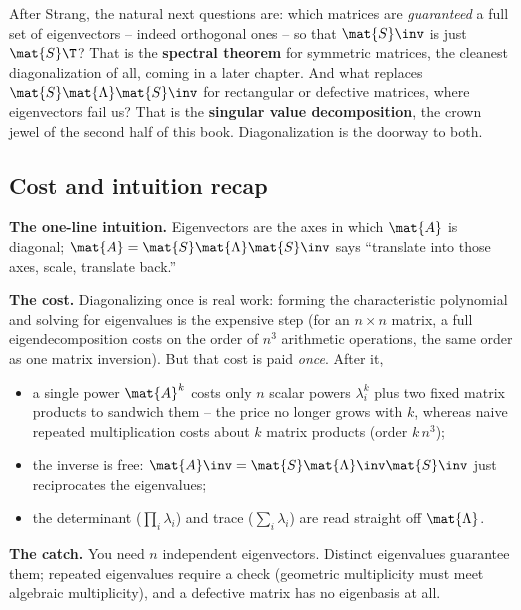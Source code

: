 \begin{strangbox}
After Strang, the natural next questions are: which matrices are
\emph{guaranteed} a full set of eigenvectors -- indeed orthogonal ones -- so that
$\mat{S}\inv$ is just $\mat{S}\T$? That is the \textbf{spectral theorem} for
symmetric matrices, the cleanest diagonalization of all, coming in a later
chapter. And what replaces $\mat{S}\mat{\Lambda}\mat{S}\inv$ for rectangular or
defective matrices, where eigenvectors fail us? That is the \textbf{singular
value decomposition}, the crown jewel of the second half of this book.
Diagonalization is the doorway to both.
\end{strangbox}

\subsection{Cost and intuition recap}
\label{ch24:recap}

\begin{recoverybox}
\textbf{The one-line intuition.} Eigenvectors are the axes in which $\mat{A}$ is
diagonal; $\mat{A} = \mat{S}\mat{\Lambda}\mat{S}\inv$ says ``translate into those
axes, scale, translate back.''

\textbf{The cost.} Diagonalizing once is real work: forming the characteristic
polynomial and solving for eigenvalues is the expensive step (for an $n\times n$
matrix, a full eigendecomposition costs on the order of $n^3$ arithmetic
operations, the same order as one matrix inversion). But that cost is paid
\emph{once}. After it,
\begin{itemize}
  \item a single power $\mat{A}^k$ costs only $n$ scalar powers $\lambda_i^k$ plus
        two fixed matrix products to sandwich them -- the price no longer grows
        with $k$, whereas naive repeated multiplication costs about $k$ matrix
        products (order $k\,n^3$);
  \item the inverse is free: $\mat{A}\inv =
        \mat{S}\mat{\Lambda}\inv\mat{S}\inv$ just reciprocates the eigenvalues;
  \item the determinant ($\prod_i\lambda_i$) and trace ($\sum_i\lambda_i$) are
        read straight off $\mat{\Lambda}$.
\end{itemize}

\textbf{The catch.} You need $n$ independent eigenvectors. Distinct eigenvalues
guarantee them; repeated eigenvalues require a check (geometric multiplicity must
meet algebraic multiplicity), and a defective matrix has no eigenbasis at all.
\end{recoverybox}

